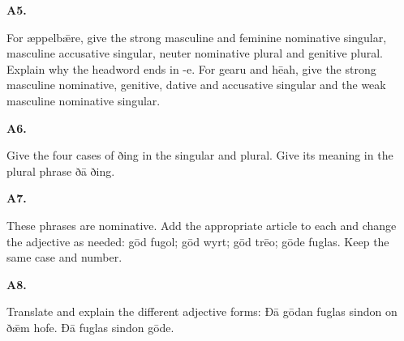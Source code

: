 \par\begin{minipage}{\linewidth}\raggedright
\textbf{A5.}

For æppelbǣre, give the strong masculine and feminine nominative singular, masculine accusative singular, neuter nominative plural and genitive plural. Explain why the headword ends in -e. For gearu and hēah, give the strong masculine nominative, genitive, dative and accusative singular and the weak masculine nominative singular.

\end{minipage}\par\addvspace{4pt}

\par\begin{minipage}{\linewidth}\raggedright
\textbf{A6.}

Give the four cases of ðing in the singular and plural. Give its meaning in the plural phrase ðā ðing.

\end{minipage}\par\addvspace{4pt}

\par\begin{minipage}{\linewidth}\raggedright
\textbf{A7.}

These phrases are nominative. Add the appropriate article to each and change the adjective as needed: gōd fugol; gōd wyrt; gōd trēo; gōde fuglas. Keep the same case and number.

\end{minipage}\par\addvspace{4pt}

\par\begin{minipage}{\linewidth}\raggedright
\textbf{A8.}

Translate and explain the different adjective forms: Ðā gōdan fuglas sindon on ðǣm hofe. Ðā fuglas sindon gōde.

\end{minipage}\par\addvspace{4pt}

